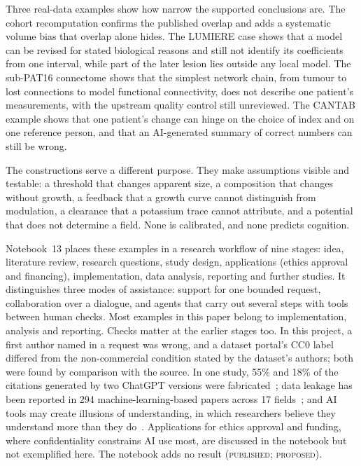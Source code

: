 \documentclass[11pt,a4paper]{article}
\newcommand{\evidence}[1]{\textsc{#1}}
\begin{document}
Three real-data examples show how narrow the supported conclusions are. The
cohort recomputation confirms the published overlap and adds a systematic
volume bias that overlap alone hides. The LUMIERE case shows that a model can
be revised for stated biological reasons and still not identify its
coefficients from one interval, while part of the later lesion lies outside
any local model. The sub-PAT16 connectome shows that the simplest network
chain, from tumour to lost connections to model functional connectivity,
does not describe one patient's measurements, with the upstream quality
control still unreviewed. The CANTAB example shows that one patient's change
can hinge on the choice of index and on one reference person, and that an
AI-generated summary of correct numbers can still be wrong.

The constructions serve a different purpose. They make assumptions visible
and testable: a threshold that changes apparent size, a composition that
changes without growth, a feedback that a growth curve cannot distinguish
from modulation, a clearance that a potassium trace cannot attribute, and a
potential that does not determine a field. None is calibrated, and none
predicts cognition.

Notebook~13 places these examples in a research workflow of nine stages:
idea, literature review, research questions, study design, applications
(ethics approval and financing), implementation, data analysis, reporting and
further studies. It distinguishes three modes of assistance: support for one
bounded request, collaboration over a dialogue, and agents that carry out
several steps with tools between human checks. Most examples in this paper
belong to implementation, analysis and reporting. Checks matter at the earlier
stages too. In this project, a first author named in a request was wrong, and
a dataset portal's CC0 label differed from the non-commercial condition stated
by the dataset's authors; both were found by comparison with the source. In
one study, 55\% and 18\% of the citations generated by two ChatGPT versions
were fabricated~\cite{walters2023}; data leakage has been reported in 294
machine-learning-based papers across 17 fields~\cite{kapoor2023}; and AI tools
may create illusions of understanding, in which researchers believe they
understand more than they do~\cite{messeri2024}. Applications for ethics
approval and funding, where confidentiality constrains AI use most, are
discussed in the notebook but not exemplified here. The notebook adds no
result (\evidence{published}; \evidence{proposed}).
\end{document}
